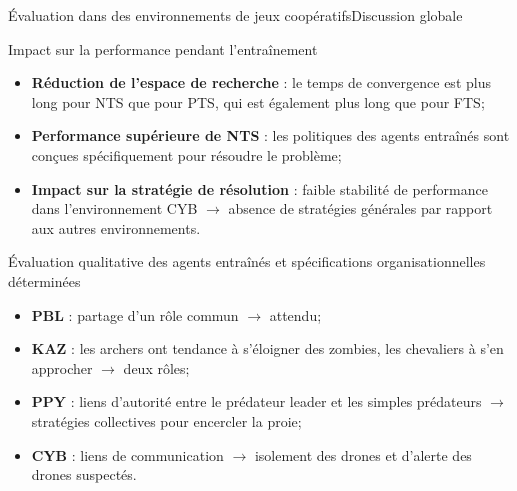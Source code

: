 \begin{frame}{Évaluation dans des environnements de jeux coopératifs}{Discussion globale}

    \begin{block}{Impact sur la performance pendant l'entraînement}
        \begin{itemize}
            \item \textbf{Réduction de l'espace de recherche} : le temps de convergence est plus long pour NTS que pour PTS, qui est également plus long que pour FTS;
            \item \textbf{Performance supérieure de NTS} : les politiques des agents entraînés sont conçues spécifiquement pour résoudre le problème;
            \item \textbf{Impact sur la stratégie de résolution} : faible stabilité de performance dans l'environnement CYB $\rightarrow$ absence de stratégies générales par rapport aux autres environnements.
        \end{itemize}
    \end{block}

    \begin{block}{Évaluation qualitative des agents entraînés et spécifications organisationnelles déterminées}
        \begin{itemize}
            \item \textbf{PBL} : partage d'un rôle commun $\rightarrow$ attendu;
            \item \textbf{KAZ} : les archers ont tendance à s'éloigner des zombies, les chevaliers à s'en approcher $\rightarrow$ deux rôles;
            \item \textbf{PPY} : liens d'autorité entre le prédateur leader et les simples prédateurs $\rightarrow$ stratégies collectives pour encercler la proie;
            \item \textbf{CYB} : liens de communication $\rightarrow$ isolement des drones et d'alerte des drones suspectés.
        \end{itemize}
    \end{block}

\end{frame}
